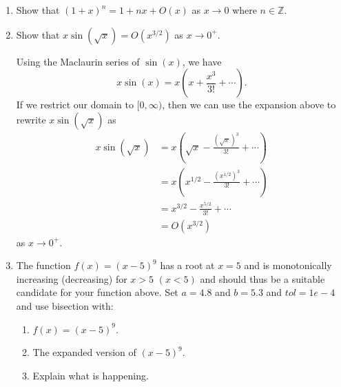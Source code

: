 \documentclass[a4paper,10pt]{article}
\newcommand{\ints}{\mathbb{Z}}
\begin{document}
\begin{enumerate}[label = \arabic*.)]
            \item Show that $(1 + x)^n = 1 + nx + O(x)$ as $x \to 0$ where $n \in \ints$.
            
            \item Show that $x \sin (\sqrt{x}) = O(x^{3/2})$ as $x \to 0^+$.
            
            Using the Maclaurin series of $\sin(x)$, we have
            \[
                x \sin(x) = x \left(x + \frac{x^3}{3!} + \cdots\right).
            \]
            If we restrict our domain to $[0, \infty)$, then we can use the expansion above to rewrite $x \sin (\sqrt{x})$ as
            \begin{align*}
                x \sin(\sqrt{x}) &= x \left(\sqrt{x} - \frac{(\sqrt{x})^3}{3!} + \cdots \right) \\
                &= x \left(x^{1/2} - \frac{(x^{1/2})^3}{3!} + \cdots \right) \\
                &= x^{3/2} - \frac{x^{5/2}}{3!} + \cdots \\
                &= O(x^{3/2}) 
            \end{align*}
            as $x \to 0^+$.
            
            \item The function $f(x) = (x - 5)^9$ has a root at $x = 5$ and is monotonically increasing (decreasing) for $x > 5$ $(x < 5)$ and should thus be a suitable candidate for your function above. Set $a = 4.8$ and $b = 5.3$ and $tol = 1e-4$ and use bisection with:
                \begin{enumerate}[label = \roman*.]
                    \item $f(x) = (x - 5)^9$.
                    
                    \item The expanded version of $(x - 5)^9$.
                    
                    \item Explain what is happening.
                \end{enumerate}
\end{enumerate}
\end{document}
